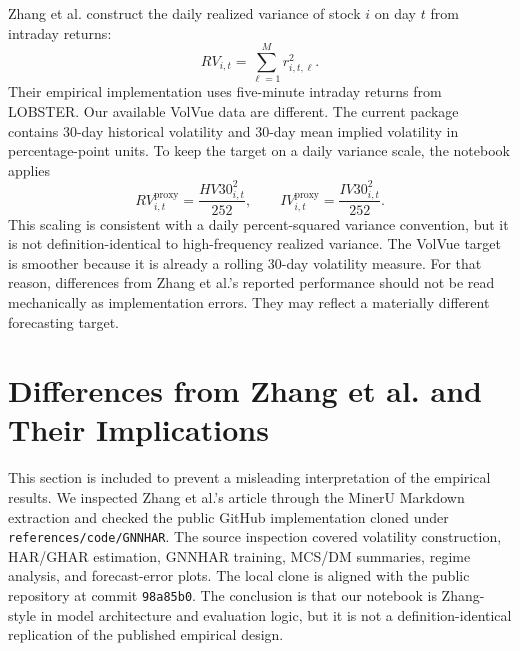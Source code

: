 \documentclass[11pt]{article}
\begin{document}
Zhang et al. construct the daily realized variance of stock \(i\) on day \(t\) from intraday returns:
\[
  RV_{i,t} = \sum_{\ell=1}^{M} r_{i,t,\ell}^{2}.
\]
Their empirical implementation uses five-minute intraday returns from LOBSTER.
Our available VolVue data are different.
The current package contains 30-day historical volatility and 30-day mean implied volatility in percentage-point units.
To keep the target on a daily variance scale, the notebook applies
\[
  RV^{\mathrm{proxy}}_{i,t}
  =
  \frac{HV30_{i,t}^{2}}{252},
  \qquad
  IV^{\mathrm{proxy}}_{i,t}
  =
  \frac{IV30_{i,t}^{2}}{252}.
\]
This scaling is consistent with a daily percent-squared variance convention, but it is not definition-identical to high-frequency realized variance.
The VolVue target is smoother because it is already a rolling 30-day volatility measure.
For that reason, differences from Zhang et al.'s reported performance should not be read mechanically as implementation errors.
They may reflect a materially different forecasting target.

\section{Differences from Zhang et al. and Their Implications}

This section is included to prevent a misleading interpretation of the empirical results.
We inspected Zhang et al.'s article through the MinerU Markdown extraction and checked the public GitHub implementation cloned under \texttt{references/code/GNNHAR}.
The source inspection covered volatility construction, HAR/GHAR estimation, GNNHAR training, MCS/DM summaries, regime analysis, and forecast-error plots.
The local clone is aligned with the public repository at commit \texttt{98a85b0}.
The conclusion is that our notebook is Zhang-style in model architecture and evaluation logic, but it is not a definition-identical replication of the published empirical design.
\end{document}
